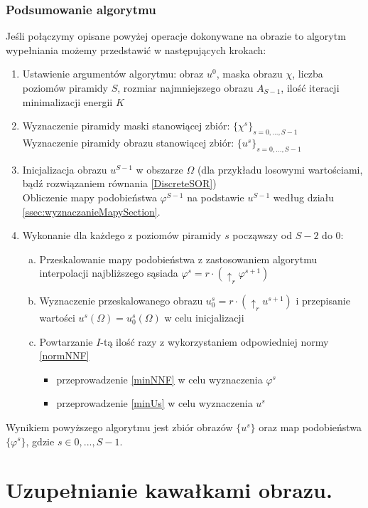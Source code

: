 \documentclass[12pt, twoside, openany]{report}
\theoremstyle{definition}
\begin{document}
\subsection{Podsumowanie algorytmu}
Jeśli połączymy opisane powyżej operacje dokonywane na obrazie to algorytm wypełniania możemy przedstawić w następujących krokach:
\begin{enumerate}
\item
Ustawienie argumentów algorytmu: obraz $u^{0}$, maska obrazu $\chi$, liczba poziomów piramidy $S$, rozmiar najmniejszego obrazu $A_{S-1}$, ilość iteracji minimalizacji energii $K$
\item
Wyznaczenie piramidy maski stanowiącej zbiór: $\{\chi^s\}_{s=0,...,S-1}$ \\
Wyznaczenie piramidy obrazu stanowiącej zbiór: $\{u^s\}_{s=0,...,S-1}$
\item
Inicjalizacja obrazu $u^{S-1}$ w obszarze $\Omega$ (dla przykładu losowymi wartościami, bądź rozwiązaniem równania \eqref{DiscreteSOR})\\
Obliczenie mapy podobieństwa $\varphi^{S-1}$ na podstawie $u^{S-1}$ według działu \ref{ssec:wyznaczanieMapySection}.
\item
Wykonanie dla każdego z poziomów piramidy $s$ począwszy od $S-2$ do $0$:
\begin{enumerate}[a)]
\item
Przeskalowanie mapy podobieństwa z zastosowaniem algorytmu interpolacji najbliższego sąsiada $\varphi^s=r \cdot (\uparrow_r \varphi^{s+1})$
\item
Wyznaczenie przeskalowanego obrazu $u^s_0=r \cdot (\uparrow_r u^{s+1})$ i przepisanie wartości $u^s(\Omega)=u^s_0(\Omega)$ w celu inicjalizacji
\item
Powtarzanie $I$-tą ilość razy z wykorzystaniem odpowiedniej normy \eqref{normNNF}
\begin{itemize}
\item
przeprowadzenie \eqref{minNNF} w celu wyznaczenia $\varphi^s$
\item
przeprowadzenie \eqref{minUs} w celu wyznaczenia $u^s$
\end{itemize}  
\end{enumerate}
\end{enumerate}
Wynikiem powyższego algorytmu jest zbiór obrazów $\{u^s\}$ oraz map podobieństwa $\{\varphi^s\}$, gdzie $s \in {0,...,S-1}$.
\chapter{Uzupełnianie kawałkami obrazu.}
\end{document}
